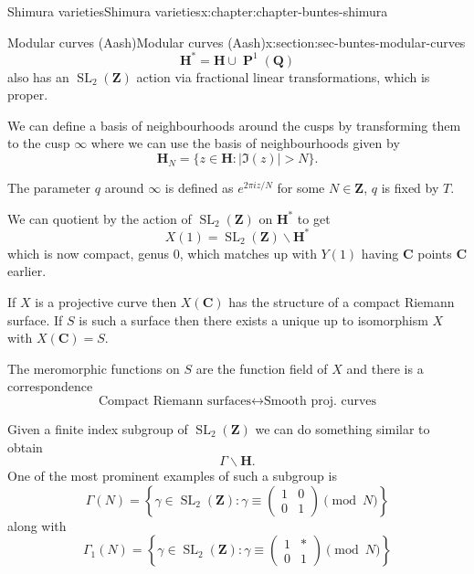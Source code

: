 \documentclass[oneside,10pt,]{book}
\numberwithin{equation}{section}
\newcommand{\ZZ}{\mathbf{Z}}
\newcommand{\QQ}{\mathbf{Q}}
\newcommand{\CC}{\mathbf{C}}
\newcommand{\HH}{\mathbf{H}}
\DeclareMathOperator{\PP}{\mathbf{P}}
\DeclareMathOperator{\SL}{SL}
\newcommand{\gt}{>}
\newcommand{\amp}{&}
\begin{document}
\begin{chapterptx}{Shimura varieties}{}{Shimura varieties}{}{}{x:chapter:chapter-buntes-shimura}
\begin{sectionptx}{Modular curves (Aash)}{}{Modular curves (Aash)}{}{}{x:section:sec-buntes-modular-curves}
\begin{equation*}
\HH^* = \HH \cup \PP^1 (\QQ)
\end{equation*}
also has an \(\SL_2(\ZZ)\) action via fractional linear transformations, which is proper.%
\par
We can define a basis of neighbourhoods around the cusps by transforming them to the cusp \(\infty\) where we can use the basis of neighbourhoods given by%
\begin{equation*}
\HH_N = \{ z\in \HH : | \Im(z)| \gt N\}\text{.}
\end{equation*}
%
\par
The parameter \(q\) around \(\infty\) is defined as \(e^{2\pi i z/N}\) for some \(N\in \ZZ\), \(q\) is fixed by \(T\).%
\par
We can quotient by the action of \(\SL_2(\ZZ) \) on \(\HH^*\) to get%
\begin{equation*}
X(1) = \SL_2(\ZZ) \backslash \HH^*
\end{equation*}
which is now compact, genus 0, which matches up with \(Y(1)\) having \(\CC\) points \(\CC\) earlier.%
\par
If \(X\) is a projective curve then \(X(\CC)\) has the structure of a compact Riemann surface. If \(S\) is such a surface then there exists a unique up to isomorphism \(X\) with \(X(\CC) = S\).%
\par
The meromorphic functions on \(S\) are the function field of \(X\) and there is a correspondence%
\begin{equation*}
\text{Compact Riemann surfaces} \leftrightarrow \text{Smooth proj. curves}
\end{equation*}
%
\par
Given a finite index subgroup of \(\SL_2(\ZZ)\) we can do something similar to obtain%
\begin{equation*}
\Gamma\backslash \HH\text{.}
\end{equation*}
One of the most prominent examples of such a subgroup is%
\begin{equation*}
\Gamma(N) = \left\{ \gamma \in \SL_2(\ZZ) : \gamma \equiv \begin{pmatrix} 1\amp0 \\ 0 \amp 1 \end{pmatrix} \pmod N \right\}
\end{equation*}
along with%
\begin{equation*}
\Gamma_1(N) = \left\{ \gamma \in \SL_2(\ZZ) : \gamma \equiv \begin{pmatrix} 1\amp\ast \\ 0 \amp 1 \end{pmatrix} \pmod N \right\}

\end{equation*}
\end{sectionptx}
\end{chapterptx}
\end{document}
